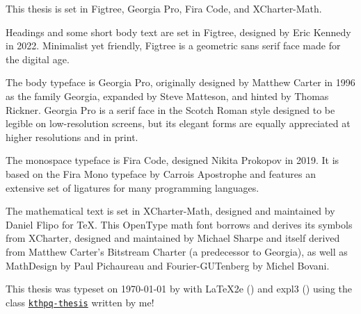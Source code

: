 
\backmatter

\printindex

\begin{colophon}[.5\textwidth]
\footnotesize
\setlength{\parindent}{1pc}
\noindent This thesis is set in Figtree, Georgia Pro, Fira Code, and XCharter-Math.

Headings and some short body text are set in Figtree, designed by Eric Kennedy in 2022. Minimalist yet friendly, Figtree is a geometric sans serif face made for the digital age.

The body typeface is Georgia Pro, originally designed by Matthew Carter in 1996 as the family Georgia, expanded by Steve Matteson, and hinted by Thomas Rickner. Georgia Pro is a serif face in the Scotch Roman style designed to be legible on low-resolution screens, but its elegant forms are equally appreciated at higher resolutions and in print.

The monospace typeface is Fira Code, designed Nikita Prokopov in 2019. It is based on the Fira Mono typeface by Carrois Apostrophe and features an extensive set of ligatures for many programming languages.

The mathematical text is set in XCharter-Math, designed and maintained by Daniel Flipo for \TeX. This OpenType math font borrows and derives its symbols from XCharter, designed and maintained by Michael Sharpe and itself derived from Matthew Carter's Bitstream Charter (a predecessor to Georgia), as well as MathDesign by Paul Pichaureau and Fourier-GUTenberg by Michel Bovani.

\mydinkus

\noindent This thesis was typeset on \today{} by \formattedluatexbanner{} with \LaTeX2e{} (\fmtversion) and \textsf{expl3} (\ExplLoaderFileDate) using the class \href{https://github.com/th-rtyf-re/kthpq-thesis}{\texttt{kthpq-thesis}} written by me!
\end{colophon}
